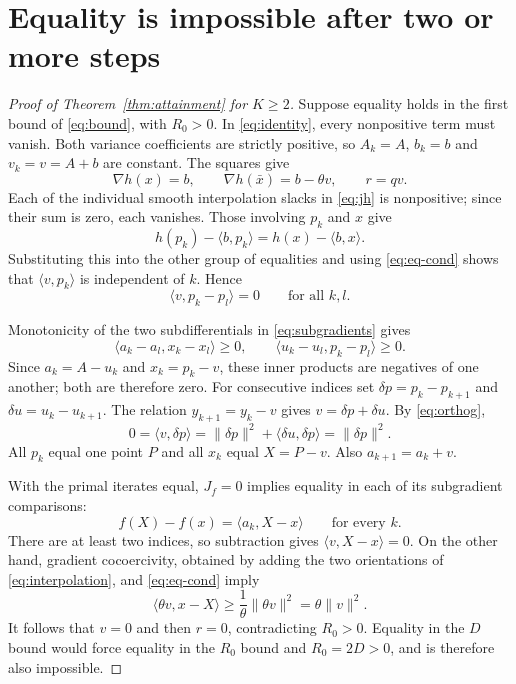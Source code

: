 \documentclass[11pt,a4paper]{article}
\theoremstyle{remark}\newtheorem{remark}[theorem]{Remark}
\newcommand{\ip}[2]{\langle #1,#2\rangle}
\newcommand{\norm}[1]{\lVert #1\rVert}
\begin{document}
\section{Equality is impossible after two or more steps}

\begin{proof}[Proof of Theorem~\ref{thm:attainment} for $K\ge2$]
Suppose equality holds in the first bound of \eqref{eq:bound}, with $R_0>0$. In \eqref{eq:identity}, every nonpositive term must vanish. Both variance coefficients are strictly positive, so $A_k=A$, $b_k=b$ and $v_k=v=A+b$ are constant. The squares give
\begin{equation}\label{eq:eq-cond}
\nabla h(x)=b,\qquad \nabla h(\bar x)=b-\theta v,\qquad r=qv.
\end{equation}
Each of the individual smooth interpolation slacks in \eqref{eq:jh} is nonpositive; since their sum is zero, each vanishes. Those involving $p_k$ and $x$ give
\[
h(p_k)-\ip b{p_k}=h(x)-\ip b{x}.
\]
Substituting this into the other group of equalities and using \eqref{eq:eq-cond} shows that $\ip v{p_k}$ is independent of $k$. Hence
\begin{equation}\label{eq:orthog}
\ip v{p_k-p_l}=0\qquad\text{for all }k,l.
\end{equation}

Monotonicity of the two subdifferentials in \eqref{eq:subgradients} gives
\[
\ip{a_k-a_l}{x_k-x_l}\ge0,
\qquad \ip{u_k-u_l}{p_k-p_l}\ge0.
\]
Since $a_k=A-u_k$ and $x_k=p_k-v$, these inner products are negatives of one another; both are therefore zero. For consecutive indices set $\delta p=p_k-p_{k+1}$ and $\delta u=u_k-u_{k+1}$. The relation $y_{k+1}=y_k-v$ gives $v=\delta p+\delta u$. By \eqref{eq:orthog},
\[
0=\ip v{\delta p}=\norm{\delta p}^2+\ip{\delta u}{\delta p}
=\norm{\delta p}^2.
\]
All $p_k$ equal one point $P$ and all $x_k$ equal $X=P-v$. Also $a_{k+1}=a_k+v$.

With the primal iterates equal, $J_f=0$ implies equality in each of its subgradient comparisons:
\[
f(X)-f(x)=\ip{a_k}{X-x}\qquad\text{for every }k.
\]
There are at least two indices, so subtraction gives $\ip v{X-x}=0$. On the other hand, gradient cocoercivity, obtained by adding the two orientations of \eqref{eq:interpolation}, and \eqref{eq:eq-cond} imply
\[
\ip{\theta v}{x-X}\ge\frac1\theta\norm{\theta v}^2
=\theta\norm v^2.
\]
It follows that $v=0$ and then $r=0$, contradicting $R_0>0$. Equality in the $D$ bound would force equality in the $R_0$ bound and $R_0=2D>0$, and is therefore also impossible.
\end{proof}
\end{document}
